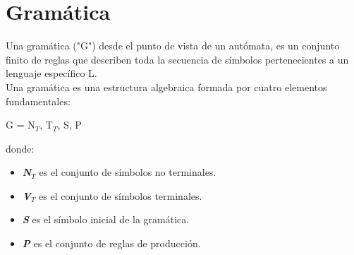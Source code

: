 \chapter{Gramática}
Una gramática ("G") desde el punto de vista de un autómata, es un conjunto finito de reglas que describen toda la secuencia de
símbolos pertenecientes a un lenguaje específico L.\\

Una gramática es una estructura algebraica formada por cuatro elementos fundamentales: 
\begin{center}
   G = { N$_{T}$, T$_{T}$, S, P } 
\end{center}
donde:\\
\begin{itemize}
   \item \textbf{\textit{N$_{T}$}} es el conjunto de símbolos no terminales.
   \item \textbf{\textit{V$_{T}$}} es el conjunto de símbolos terminales. 
   \item \textbf{\textit{S}} es el símbolo inicial de la gramática. 
   \item \textbf{\textit{P}} es el conjunto de reglas de producción. 
\end{itemize}

